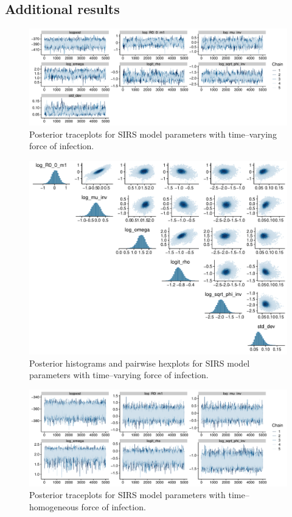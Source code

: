 \newpage
\subsection{Additional results}
\label{subsec:sinfoi_supp_res}

\begin{figure}[htbp]
	\centering
	\includegraphics[width=\linewidth]{figures/sinfoi_rw1_traces}
	\caption{Posterior traceplots for SIRS model parameters with time--varying force of infection.}
	\label{fig:sinfoirw1traces}
\end{figure}

\begin{figure}[htbp]
	\centering
	\includegraphics[width=\linewidth]{figures/sinfoi_rw1_pairs}
	\caption{Posterior histograms and pairwise hexplots for SIRS model parameters with time--varying force of infection.}
	\label{fig:sinfoirw1pairs}
\end{figure}

\begin{figure}[htbp]
	\centering
	\includegraphics[width=\linewidth]{figures/sinfoi_const_traces}
	\caption{Posterior traceplots for SIRS model parameters with time--homogeneous force of infection.}
	\label{fig:sinfoiconsttraces}
\end{figure}

